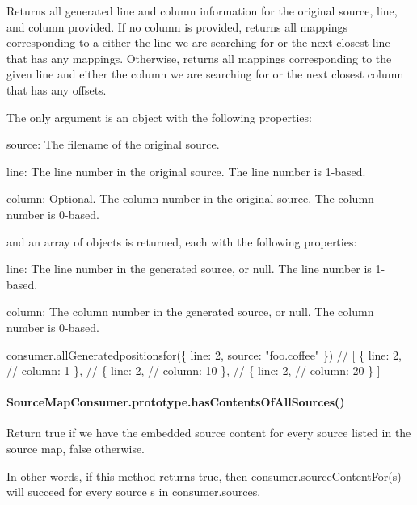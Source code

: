 Returns all generated line and column information for the original source, line, and column provided. If no column is provided, returns all mappings corresponding to a either the line we are searching for or the next closest line that has any mappings. Otherwise, returns all mappings corresponding to the given line and either the column we are searching for or the next closest column that has any offsets.

The only argument is an object with the following properties\+:


\begin{DoxyItemize}
\item {\ttfamily source}\+: The filename of the original source.
\item {\ttfamily line}\+: The line number in the original source. The line number is 1-\/based.
\item {\ttfamily column}\+: Optional. The column number in the original source. The column number is 0-\/based.
\end{DoxyItemize}

and an array of objects is returned, each with the following properties\+:


\begin{DoxyItemize}
\item {\ttfamily line}\+: The line number in the generated source, or null. The line number is 1-\/based.
\item {\ttfamily column}\+: The column number in the generated source, or null. The column number is 0-\/based.
\end{DoxyItemize}


\begin{DoxyCode}
consumer.allGeneratedpositionsfor(\{ line: 2, source: "foo.coffee" \})
// [ \{ line: 2,
//     column: 1 \},
//   \{ line: 2,
//     column: 10 \},
//   \{ line: 2,
//     column: 20 \} ]
\end{DoxyCode}


\paragraph*{Source\+Map\+Consumer.\+prototype.\+has\+Contents\+Of\+All\+Sources()}

Return true if we have the embedded source content for every source listed in the source map, false otherwise.

In other words, if this method returns {\ttfamily true}, then {\ttfamily consumer.\+source\+Content\+For(s)} will succeed for every source {\ttfamily s} in {\ttfamily consumer.\+sources}.


